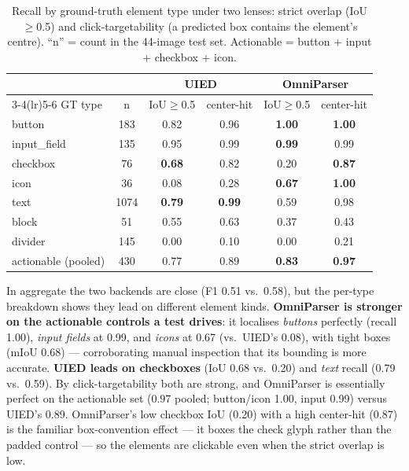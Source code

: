 \documentclass[11pt,a4paper]{article}
\begin{document}
\begin{table}[H]
  \centering
  \caption{Recall by ground-truth element type under two lenses: strict overlap
  (IoU$\geq$0.5) and click-targetability (a predicted box contains the element's
  centre). ``n'' = count in the 44-image test set. Actionable = button + input +
  checkbox + icon.}
  \label{tab:pertype}
  \begin{tabular}{lc cc cc}
    \toprule
    & & \multicolumn{2}{c}{UIED} & \multicolumn{2}{c}{OmniParser} \\
    \cmidrule(lr){3-4}\cmidrule(lr){5-6}
    GT type & n & IoU$\geq$0.5 & center-hit & IoU$\geq$0.5 & center-hit \\
    \midrule
    button       & 183  & 0.82 & 0.96 & \textbf{1.00} & \textbf{1.00} \\
    input\_field & 135  & 0.95 & 0.99 & \textbf{0.99} & 0.99 \\
    checkbox     & 76   & \textbf{0.68} & 0.82 & 0.20 & \textbf{0.87} \\
    icon         & 36   & 0.08 & 0.28 & \textbf{0.67} & \textbf{1.00} \\
    text         & 1074 & \textbf{0.79} & \textbf{0.99} & 0.59 & 0.98 \\
    block        & 51   & 0.55 & 0.63 & 0.37 & 0.43 \\
    divider      & 145  & 0.00 & 0.10 & 0.00 & 0.21 \\
    \midrule
    actionable (pooled) & 430 & 0.77 & 0.89 & \textbf{0.83} & \textbf{0.97} \\
    \bottomrule
  \end{tabular}
\end{table}

In aggregate the two backends are close (F1 0.51 vs.\ 0.58), but the per-type
breakdown shows they lead on different element kinds. \textbf{OmniParser is stronger
on the actionable controls a test drives}: it localises \emph{buttons} perfectly
(recall 1.00), \emph{input fields} at 0.99, and \emph{icons} at 0.67 (vs.\ UIED's
0.08), with tight boxes (mIoU 0.68) --- corroborating manual inspection that its
bounding is more accurate. \textbf{UIED leads on checkboxes} (IoU 0.68 vs.\ 0.20)
and \emph{text} recall (0.79 vs.\ 0.59). By click-targetability both are strong, and
OmniParser is essentially perfect on the actionable set (0.97 pooled; button/icon
1.00, input 0.99) versus UIED's 0.89. OmniParser's low checkbox IoU (0.20) with a
high center-hit (0.87) is the familiar box-convention effect --- it boxes the check
glyph rather than the padded control --- so the elements are clickable even when the
strict overlap is low.
\end{document}
